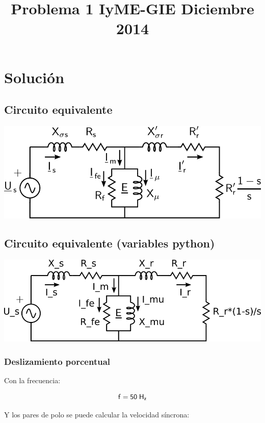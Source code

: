 \documentclass{article}
\title{Problema 1 IyME-GIE Diciembre 2014}
\begin{document}
    
    
    \maketitle
    
    

    
    \section{Solución}

    \subsection{Circuito equivalente}


    \includegraphics[scale=1.5]{png/mi_circ_math.png} 


    \subsection{Circuito equivalente (variables python)}


    \includegraphics[scale=1.5]{png/mi_circ_py.png} 


    

    \subsubsection{Deslizamiento porcentual}

    Con la frecuencia:

\[ \sf f = 50 \; H_z\]

Y los pares de polo se puede calcular la velocidad síncrona:
\end{document}
